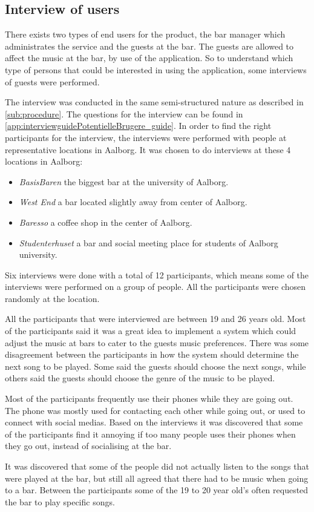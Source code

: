 \subsection{Interview of users}
\label{userInterviews}

There exists two types of end users for the product, the bar manager which administrates the service and the guests at the bar. The guests are allowed to affect the music at the bar, by use of the application. So to understand which type of persons that could be interested in using the application, some interviews of guests were performed.

The interview was conducted in the same semi-structured nature as described in \cref{sub:procedure}. The questions for the interview can be found in \cref{app:interviewguidePotentielleBrugere_guide}. In order to find the right participants for the interview, the interviews were performed with people at representative locations in Aalborg. It was chosen to do interviews at these 4 locations in Aalborg:

\begin{itemize}
    \item \emph{BasisBaren} the biggest bar at the university of Aalborg.
    \item \emph{West End} a bar located slightly away from center of Aalborg.
    \item \emph{Baresso} a coffee shop in the center of Aalborg.
    \item \emph{Studenterhuset} a bar and social meeting place for students of Aalborg university.
\end{itemize}

Six interviews were done with a total of 12 participants, which means some of the interviews were performed on a group of people. All the participants were chosen randomly at the location.

All the participants that were interviewed are between 19 and 26 years old. Most of the participants said it was a great idea to implement a system which could adjust the music at bars to cater to the guests music preferences. There was some disagreement between the participants in how the system should determine the next song to be played. Some said the guests should choose the next songs, while others said the guests should choose the genre of the music to be played.

Most of the participants frequently use their phones while they are going out. The phone was mostly used for contacting each other while going out, or used to connect with social medias.
Based on the interviews it was discovered that some of the participants find it annoying if too many people uses their phones when they go out, instead of socialising at the bar.

It was discovered that some of the people did not actually listen to the songs that were played at the bar, but still all agreed that there had to be music when going to a bar. Between the participants some of the 19 to 20 year old's often requested the bar to play specific songs.
